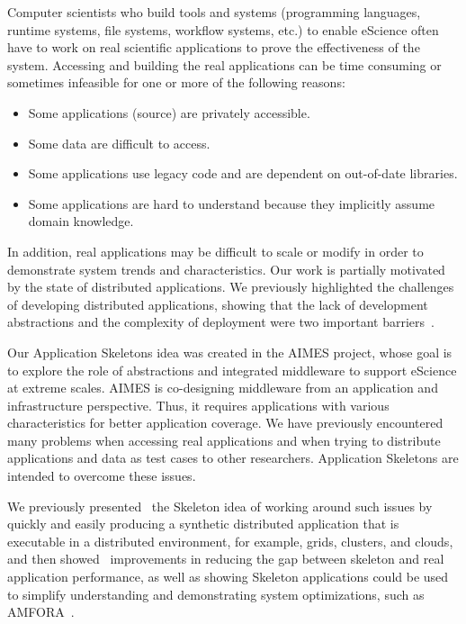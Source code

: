 \documentclass[preprint,12pt]{elsarticle}
\newcommand{\katznote}[1]{ {\textcolor{blue}    { ***Dan:   #1 }}}
\newcommand{\zhaonote}[1]{{\textcolor{cyan}{ ***Zhao:  #1 }}}
\newcommand{\jhanote}[1]{{\textcolor{green}    { ***Shantenu: #1 }}}
\newcommand{\katznote}[1]{}
\newcommand{\zhaonote}[1]{}
\newcommand{\jhanote}[1]{}
\begin{document}
Computer scientists who build tools and systems (programming languages, runtime systems, file systems, workflow systems, etc.) 
to enable eScience often have to work on real scientific applications to prove the effectiveness of 
the system. Accessing and building the real applications can be time consuming or sometimes infeasible for one
or more of the following reasons:
\begin{itemize}
\item {} Some applications (source) are privately accessible.
\item {} Some data are difficult to access.
\item {} Some applications use legacy code and are dependent on out-of-date libraries.
\item {} Some applications are hard to understand because they implicitly assume domain knowledge.
\end{itemize}

In addition, real applications may be difficult to scale or modify in order to
demonstrate system trends and characteristics. Our work is partially motivated
by the state of distributed applications.  We previously
highlighted the challenges of developing distributed applications, showing that the lack of
development abstractions and the complexity of deployment were two important
barriers~\cite{DPA-paper,dpagrid2009}.

Our Application Skeletons idea was created in the AIMES project, whose goal is
to explore the role of abstractions and integrated middleware to support
eScience at extreme scales. AIMES is co-designing middleware from an application
and infrastructure perspective. Thus, it requires applications with various
characteristics for better application coverage. We have previously encountered
many problems when accessing real applications and when trying to distribute
applications and data as test cases to other researchers. Application Skeletons
are intended to overcome these issues.

We previously presented~\cite{Skeleton2013} the Skeleton idea of working around such issues by quickly
and easily producing a synthetic distributed application that is executable in a distributed environment, for example, grids, clusters, and clouds, and then showed~\cite{Skeleton2014} improvements in reducing the gap between skeleton and real application performance, as well
as showing Skeleton applications could be used to simplify understanding and demonstrating system optimizations, such as AMFORA~\cite{AMFS2013}.
\end{document}
